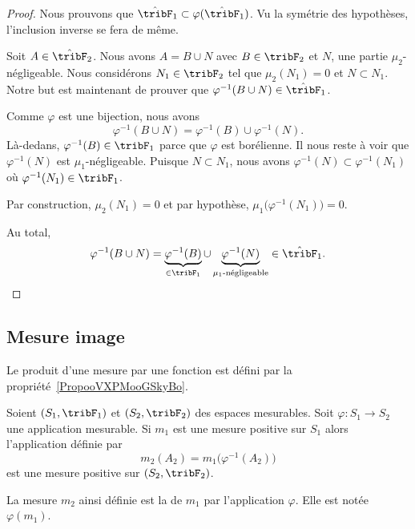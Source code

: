 \begin{proof}
	Nous prouvons que \( \hat\tribF_1\subset \varphi(\hat\tribF_1)\). Vu la symétrie des hypothèses, l'inclusion inverse se fera de même.

	Soit \( A\in\hat\tribF_2\). Nous avons \( A=B\cup N\) avec \( B\in \tribF_2\) et \( N\), une partie \( \mu_2\)-négligeable. Nous considérons \( N_1\in\tribF_2\) tel que \( \mu_2(N_1)=0\) et \( N\subset N_1\). Notre but est maintenant de prouver que \( \varphi^{-1}(B\cup N)\in \hat\tribF_1\).

	Comme \( \varphi\) est une bijection, nous avons
	\begin{equation}
		\varphi^{-1}(B\cup N)=\varphi^{-1}(B)\cup \varphi^{-1}(N).
	\end{equation}
	Là-dedans, \( \varphi^{-1}(B)\in \tribF_1\) parce que \( \varphi\) est borélienne. Il nous reste à voir que \( \varphi^{-1}(N)\) est \( \mu_1\)-négligeable. Puisque \( N\subset N_1\), nous avons \( \varphi^{-1}(N)\subset\varphi^{-1}(N_1)\) où \( \varphi^{-1}(N_1)\in\tribF_1\).

	Par construction, \( \mu_2(N_1)=0\) et par hypothèse, \( \mu_1\big( \varphi^{-1}(N_1) \big)=0\).

	Au total,
	\begin{equation}
		\varphi^{-1}(B\cup N)=\underbrace{\varphi^{-1}(B)}_{\in\tribF_1}\cup\underbrace{\varphi^{-1}(N)}_{\mu_1\text{-négligeable}}\in\hat\tribF_1.
	\end{equation}
\end{proof}

\subsection{Mesure image}

Le produit d'une mesure par une fonction est défini par la propriété~\ref{PropooVXPMooGSkyBo}.

\begin{propositionDef}     \label{PropJCJQooAdqrGA}
	Soient \( (S_1,\tribF_1)\) et \( (S_2,\tribF_2)\) des espaces mesurables. Soit \( \varphi\colon S_1\to S_2\) une application mesurable. Si \( m_1\) est une mesure positive sur \( S_1\) alors l'application définie par
	\begin{equation}
		m_2(A_2)=m_1\big( \varphi^{-1}(A_2) \big)
	\end{equation}
	est une mesure positive sur \( (S_2,\tribF_2)\).

	La mesure \( m_2\) ainsi définie est la  de \( m_1\) par l'application \( \varphi\). Elle est notée \( \varphi(m_1)\).
\end{propositionDef}

